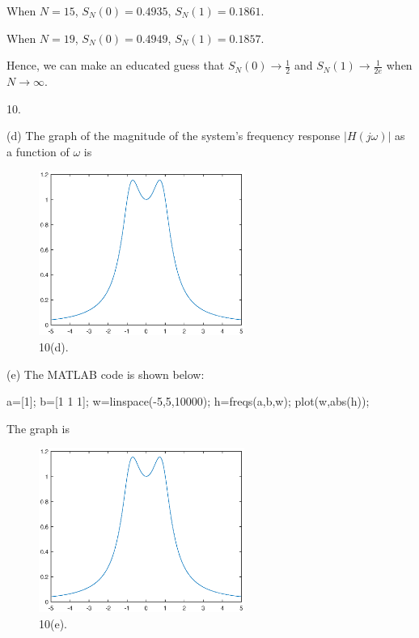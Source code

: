 \documentclass[a4paper]{article}
\begin{document}
When $N=15$, $S_N(0)=0.4935$, $S_N(1)=0.1861$.

When $N=19$, $S_N(0)=0.4949$, $S_N(1)=0.1857$.

Hence, we can make an educated guess that $S_N(0)\rightarrow\frac{1}{2}$ and $S_N(1)\rightarrow\frac{1}{2e}$ when $N\rightarrow\infty$.

10.

(d) The graph of the magnitude of the system's frequency response $|H(j\omega)|$ as a function of $\omega$ is
\begin{figure}[H]
    \begin{center}
        \includegraphics[width=0.6\textwidth]{10(d).eps}
    \end{center}
    \caption{10(d).}
\end{figure}

(e) The MATLAB code is shown below:
\begin{codebox}
    \li a=[1];
    \li b=[1 1 1];
    \li w=linspace(-5,5,10000);
    \li h=freqs(a,b,w);
    \li plot(w,abs(h));
\end{codebox}

The graph is
\begin{figure}[H]
    \begin{center}
        \includegraphics[width=0.6\textwidth]{10(e).eps}
    \end{center}
    \caption{10(e).}
\end{figure}
\end{document}
